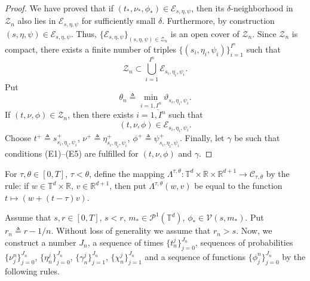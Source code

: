 \documentclass[a4paper,12pt]{article}
\newcommand{\rdp}{\mathbb{R}^{d+1}}
\newcommand{\tdr}{\mathbb{T}^{d}\times\mathbb{R}}
\newcommand{\ptd}{\mathcal{P}^1(\mathbb{T}^d)}
\begin{document}
\begin{proof}
	We have proved that if $(t_*,\nu_*,\phi_*)\in\mathcal{E}_{s,\eta,\psi}$, then its $\delta$-neighborhood in $\mathcal{Z}_n$ also lies in $\mathcal{E}_{s,\eta,\psi}$ for sufficiently small $\delta$. Furthermore, by construction $(s,\eta,\psi)\in \mathcal{E}_{s,\eta,\psi}$. Thus, $\{\mathcal{E}_{s,\eta,\psi}\}_{(s,\eta,\psi)\in\mathcal{Z}_n}$ is an open cover of $\mathcal{Z}_n$. Since $\mathcal{Z}_n$ is compact, there exists a finite number of triples $\{(s_i,\eta_i,\psi_i)\}_{i=1}^{I^n}$ such that
	$$\mathcal{Z}_n\subset \bigcup_{i=1}^{I^n}\mathcal{E}_{s_i,\eta_i,\psi_i}. $$ Put
	$$\theta_n\triangleq\min_{i=\overline{1,I^n}}\vartheta_{s_i,\eta_i,\psi_i}. $$ If $(t,\nu,\phi)\in \mathcal{Z}_n$, then there exists  $i=\overline{1,I^n}$ such that 
	$$(t,\nu,\phi)\in \mathcal{E}_{s_i,\eta_i,\psi_i}. $$ Choose $t^+\triangleq s^+_{s_i,\eta_i,\psi_i}$, $\nu^+\triangleq\eta^+_{s_i,\eta_i,\psi_i}$, $\phi^+\triangleq\psi^{+}_{s_i,\eta_i,\psi_i}$. Finally, let $\gamma$ be such that conditions (E1)--(E5) are fulfilled for $(t,\nu,\phi)$ and $\gamma$.
\end{proof}

For $\tau,\theta\in [0,T]$, $\tau<\theta$, define the mapping $\Lambda^{\tau,\theta}:\tdr\times\rdp\rightarrow \mathcal{C}_{\tau,\theta}$ by the rule: if $w\in \tdr$, $v\in\rdp$, then put
$\Lambda^{\tau,\theta}(w,v) $ be equal to the function $t\mapsto (w+(t-\tau)v)$.

Assume that $s,r\in [0,T]$, $s<r$, $m_*\in\ptd$, $\phi_*\in \mathcal{V}(s,m_*)$.  Put $r_n\triangleq r-1/n$. Without loss of generality we assume that $r_n>s$. Now, we construct a number $J_n$, a sequence of times $\{t^j_n\}_{j=0}^{J_n}$, sequences of probabilities $\{\nu_j^n\}_{j=0}^{J_n}$, $\{\eta^j_n\}_{j=0}^{J_n}$, $\{\gamma_n^j\}_{j=1}^{J_n}$, $\{\chi^j_n\}_{j=1}^{J_n}$ and a sequence of functions $\{\phi_j^n\}_{j=0}^{J_n}$ by the following rules.
\end{document}
